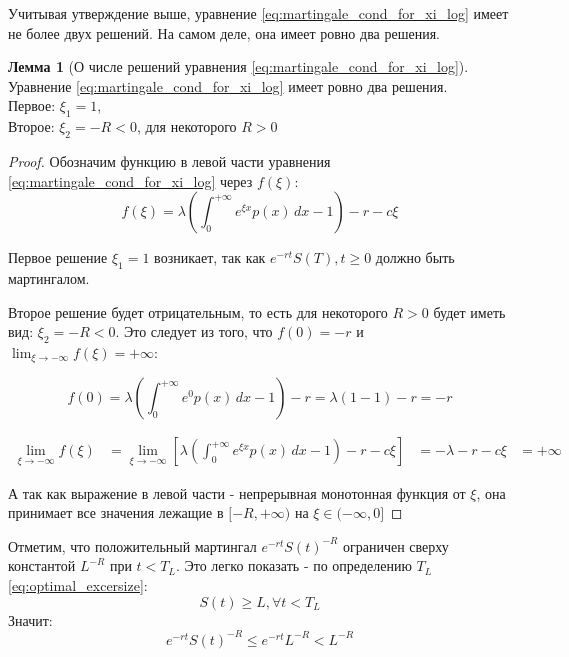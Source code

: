 \documentclass[a4paper,12pt]{article}
\theoremstyle{definition}
\newtheorem{lemma}{Лемма}
\begin{document}
Учитывая утверждение выше, уравнение \eqref{eq:martingale_cond_for_xi_log} имеет не более двух решений. На самом деле, она имеет ровно два решения.
\begin{lemma}[О числе решений уравнения \eqref{eq:martingale_cond_for_xi_log}]\label{thm:solution_for_mart_cond_m1}
Уравнение \eqref{eq:martingale_cond_for_xi_log} имеет ровно два решения. \\
Первое: $\xi_1 = 1$, \\
Второе: $\xi_2 = -R < 0$, для некоторого $R > 0$
\end{lemma}
\begin{proof}
Обозначим функцию в левой части уравнения \eqref{eq:martingale_cond_for_xi_log} через $f(\xi)$:
\begin{equation*}
f(\xi) = \lambda \left(\int_{0}^{+\infty} e^{\xi x} p(x) \,dx - 1\right) - r - c\xi
\end{equation*}

Первое решение $\xi_1 = 1$ возникает, так как ${e^{-rt} S(T), t \ge 0}$ должно быть мартингалом.

Второе решение будет отрицательным, то есть для некоторого $R > 0$ будет иметь вид: $\xi_2 = -R < 0$.
Это следует из того, что $f(0) = -r$ и $\lim_{\xi\to-\infty} f(\xi) = +\infty$:

\begin{equation*}
f(0) = \lambda \left(\int_{0}^{+\infty} e^{0} p(x) \,dx - 1\right) - r = \lambda (1 - 1) - r = -r
\end{equation*}

\begin{equation*}
\begin{split}
\lim_{\xi\to-\infty} f(\xi) &= \lim_{\xi\to-\infty} \left[ \lambda \left(\int_{0}^{+\infty} e^{\xi x} p(x) \,dx - 1\right) - r - c\xi \right] &= - \lambda - r - c \xi &= +\infty
\end{split}
\end{equation*}

А так как выражение в левой части - непрерывная монотонная функция от $\xi$, она принимает все значения лежащие в $[-R, +\infty)$ на $\xi \in (-\infty, 0]$
\end{proof}

Отметим, что положительный мартингал $e^{-rt} S(t)^{-R}$ ограничен сверху константой $L^{-R}$ при $t < T_L$. Это легко показать - по определению $T_L$ \eqref{eq:optimal_excersize}:
\begin{equation*}
S(t) \ge L, \forall t < T_L
\end{equation*}
Значит:
\begin{equation*}
e^{-rt}S(t)^{-R} \le e^{-rt}L^{-R} < L^{-R}
\end{equation*}
\end{document}
